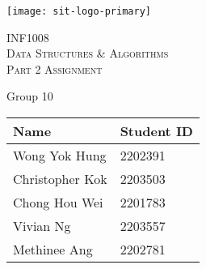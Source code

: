 \documentclass{report}
\begin{document}
\begin{titlepage}
	\centering
	\texttt{[image: sit-logo-primary]}\par\vspace{1cm}
	{\scshape\Huge{INF1008}\\Data Structures \& Algorithms\\\Large{Part 2 Assignment}\par}
	\vspace{1cm}
	{\huge{Group 10}\par}
	\vspace{0.5cm}
	\begin{table}[H]
		\large
		\centering\begin{tabular}{ll}
			\toprule
			Name & Student ID\\
			\midrule
			Wong Yok Hung & 2202391\\
			Christopher Kok & 2203503\\
			Chong Hou Wei & 2201783\\
			Vivian Ng & 2203557\\
			Methinee Ang & 2202781\\
			\bottomrule
		\end{tabular}
	\end{table}
	\vfill
\end{titlepage}
\newpage%
\tableofcontents
\thispagestyle{empty}
\pagebreak
\setcounter{page}{1}
\end{document}
